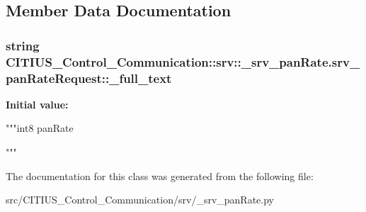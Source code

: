 \subsection{\-Member \-Data \-Documentation}
\hypertarget{class_c_i_t_i_u_s___control___communication_1_1srv_1_1__srv__pan_rate_1_1srv__pan_rate_request_a1434c552aeeb71fb02509cd1c78dc47b}{
\subsubsection[{\-\_\-full\-\_\-text}]{\setlength{\rightskip}{0pt plus 5cm}string \-C\-I\-T\-I\-U\-S\-\_\-\-Control\-\_\-\-Communication\-::srv\-::\-\_\-srv\-\_\-pan\-Rate.\-srv\-\_\-pan\-Rate\-Request\-::\-\_\-full\-\_\-text}}\label{class_c_i_t_i_u_s___control___communication_1_1srv_1_1__srv__pan_rate_1_1srv__pan_rate_request_a1434c552aeeb71fb02509cd1c78dc47b}
{\bfseries \-Initial value\-:}
\begin{DoxyCode}
"""int8 panRate

"""
\end{DoxyCode}


\-The documentation for this class was generated from the following file\-:\begin{DoxyCompactItemize}
\item 
src/\-C\-I\-T\-I\-U\-S\-\_\-\-Control\-\_\-\-Communication/srv/\-\_\-srv\-\_\-pan\-Rate.\-py\end{DoxyCompactItemize}
